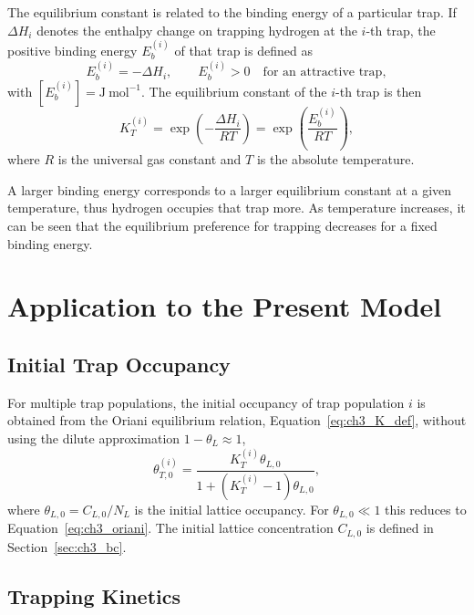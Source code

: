 \documentclass[a4paper,12pt,oneside]{report}
\begin{document}
The equilibrium constant is related to the binding energy of a particular trap. If $\Delta H_i$ denotes the enthalpy change on trapping hydrogen at the $i$-th trap, the positive binding energy $E_b^{(i)}$ of that trap is defined as
\begin{equation}
E_b^{(i)}=-\Delta H_i,
\qquad
E_b^{(i)}>0
\quad\text{for an attractive trap},
\label{eq:ch3_binding_energy_convention}
\end{equation}
with $[E_b^{(i)}]=\mathrm{J~mol^{-1}}$. The equilibrium constant of the $i$-th trap is then
\begin{equation}
K_T^{(i)} = \exp\left(-\frac{\Delta H_i}{RT}\right) = \exp\left(\frac{E_b^{(i)}}{RT}\right),
\label{eq:ch3_K_energy}
\end{equation}
where $R$ is the universal gas constant and $T$ is the absolute temperature.

A larger binding energy corresponds to a larger equilibrium constant at a given temperature, thus hydrogen occupies that trap more. As temperature increases, it can be seen that the equilibrium preference for trapping decreases for a fixed binding energy.

\section{Application to the Present Model}

\subsection{Initial Trap Occupancy}

For multiple trap populations, the initial occupancy of trap population $i$ is obtained from the Oriani equilibrium relation, Equation~\eqref{eq:ch3_K_def}, without using the dilute approximation $1-\theta_L\approx1$,
\begin{equation}
\theta_{T,0}^{(i)} = \frac{K_T^{(i)}\theta_{L,0}}{1+\left(K_T^{(i)}-1\right)\theta_{L,0}},
\label{eq:ch3_theta_init}
\end{equation}
where $\theta_{L,0}=C_{L,0}/N_L$ is the initial lattice occupancy. For $\theta_{L,0}\ll1$ this reduces to Equation~\eqref{eq:ch3_oriani}. The initial lattice concentration $C_{L,0}$ is defined in Section~\ref{sec:ch3_bc}.

\subsection{Trapping Kinetics}
\end{document}
